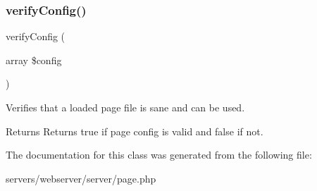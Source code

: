\subsubsection{\texorpdfstring{verify\+Config()}{verifyConfig()}}
{\footnotesize\ttfamily verify\+Config (\begin{DoxyParamCaption}\item[{array}]{\$config }\end{DoxyParamCaption})\hspace{0.3cm}{\ttfamily [private]}}

Verifies that a loaded page file is sane and can be used. \begin{DoxyReturn}{Returns}
Returns true if page config is valid and false if not. 
\end{DoxyReturn}



The documentation for this class was generated from the following file\+:\begin{DoxyCompactItemize}
\item 
servers/webserver/server/page.\+php\end{DoxyCompactItemize}
